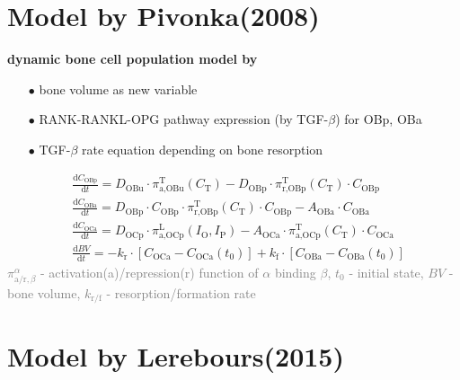 \documentclass[%
aspectratio=169,  %
]{beamer}
\begin{document}
\section*{Model by Pivonka(2008)}
\begin{frame}
\textbf{dynamic bone cell population model by \cite{Pivonka.2008}}
\begin{itemize}
	\item [$\bullet$]  bone volume as new variable
	\item [$\bullet$] RANK-RANKL-OPG pathway expression (by TGF-$\beta$) for OBp, OBa
	\item[$\bullet$] TGF-$\beta$ rate equation depending on bone resorption
\end{itemize}
\begin{subequations}
	\begin{align}
		& \frac{\text{d} C_\text{OBp}}{\text{d} t} =  D_\text{OBu} \cdot \pi_{\text{a,OBu}}^\text{T} (C_\text{T})-  D_\text{OBp}  \cdot \pi_{\text{r,OBp}}^\text{T}(C_\text{T})  \cdot C_\text{OBp}\\
		& \frac{\text{d} C_\text{OBa}}{\text{d} t} =   D_\text{OBp} \cdot  C_\text{OBp} \cdot  \pi_{\text{r,OBp}}^\text{T} (C_\text{T})  \cdot  C_\text{OBp}-  A_\text{OBa}  \cdot C_\text{OBa}\\ 
		& \frac{\text{d} C_\text{OCa}}{\text{d} t} =  D_\text{OCp} \cdot \pi_{\text{a,OCp}}^{\text{L}} (I_\text{O},I_\text{P})-  A_\text{OCa}  \cdot \pi_{\text{a,OCp}}^\text{T}(C_\text{T})  \cdot C_\text{OCa}   \\
		& \frac{\text{d} BV}{\text{d} t} = -k_\text{r} \cdot [C_\text{OCa} - C_\text{OCa}(t_0)] + k_\text{f} \cdot [C_\text{OBa} - C_\text{OBa}(t_0)]
	\end{align}
	\label{eq:model2}
\end{subequations}
\textcolor{gray}{$\pi^\alpha_{\text{a/r}, \beta}$ - activation(a)/repression(r) function of $\alpha$ binding $\beta$, $t_0$ - initial state, $BV$ - bone volume, $k_\text{r/f}$ - resorption/formation rate}
\end{frame}

\section*{Model by Lerebours(2015)}
\end{document}
